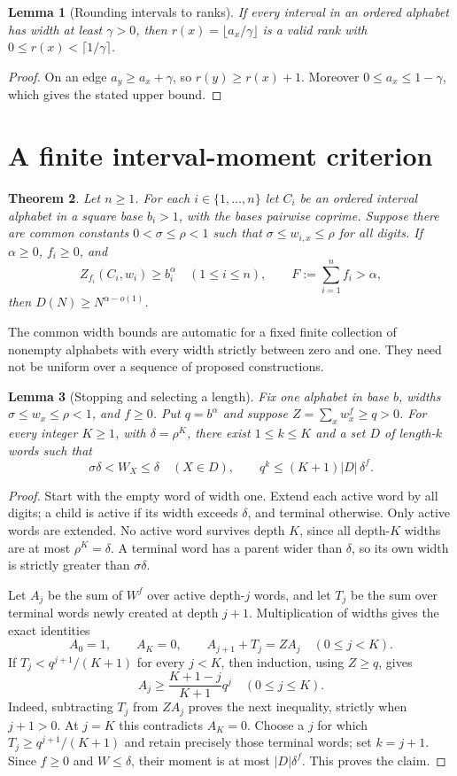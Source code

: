 \documentclass[11pt]{article}
\newtheorem{theorem}{Theorem}[section]
\newtheorem{lemma}[theorem]{Lemma}
\theoremstyle{definition}
\theoremstyle{remark}
\newcommand{\card}[1]{\lvert #1\rvert}
\begin{document}
\begin{lemma}[Rounding intervals to ranks]\label{lem:round}
If every interval in an ordered alphabet has width at least $\gamma>0$,
then $r(x)=\lfloor a_x/\gamma\rfloor$ is a valid rank with
$0\le r(x)<\lceil1/\gamma\rceil$.
\end{lemma}
\begin{proof}
On an edge $a_y\ge a_x+\gamma$, so $r(y)\ge r(x)+1$.
Moreover $0\le a_x\le1-\gamma$, which gives the stated upper bound.
\end{proof}

\section{A finite interval-moment criterion}\label{sec:criterion}
\begin{theorem}\label{thm:criterion}
Let $n\ge1$. For each $i\in\{1,\ldots,n\}$ let $C_i$ be an ordered
interval alphabet in a square base $b_i>1$, with the bases pairwise coprime.
Suppose there are common constants $0<\sigma\le\rho<1$ such that
$\sigma\le w_{i,x}\le\rho$ for all digits. If $\alpha\ge0$, $f_i\ge0$,
and
\[
 Z_{f_i}(C_i,w_i)\ge b_i^\alpha\quad(1\le i\le n),
 \qquad F:=\sum_{i=1}^nf_i>\alpha,
\]
then $D(N)\ge N^{\alpha-o(1)}$.
\end{theorem}
The common width bounds are automatic for a fixed finite collection of
nonempty alphabets with every width strictly between zero and one. They need
not be uniform over a sequence of proposed constructions.

\begin{lemma}[Stopping and selecting a length]\label{lem:stopping}
Fix one alphabet in base $b$, widths $\sigma\le w_x\le\rho<1$, and
$f\ge0$. Put $q=b^\alpha$ and suppose $Z=\sum_xw_x^f\ge q>0$.
For every integer $K\ge1$, with $\delta=\rho^K$, there exist
$1\le k\le K$ and a set $D$ of length-$k$ words such that
\[
 \sigma\delta<W_X\le\delta\quad(X\in D),\qquad
 q^k\le(K+1)\card D\,\delta^f.
\]
\end{lemma}
\begin{proof}
Start with the empty word of width one. Extend each active word by all
digits; a child is active if its width exceeds $\delta$, and terminal
otherwise. Only active words are extended. No active word survives depth
$K$, since all depth-$K$ widths are at most $\rho^K=\delta$.
A terminal word has a parent wider than $\delta$, so its own width is
strictly greater than $\sigma\delta$.

Let $A_j$ be the sum of $W^f$ over active depth-$j$ words, and let $T_j$
be the sum over terminal words newly created at depth $j+1$. Multiplication
of widths gives the exact identities
\[
 A_0=1,\qquad A_K=0,\qquad A_{j+1}+T_j=Z A_j\quad(0\le j<K).
\]
If $T_j<q^{j+1}/(K+1)$ for every $j<K$, then induction, using $Z\ge q$,
gives
\[
 A_j\ge \frac{K+1-j}{K+1}q^j\quad(0\le j\le K).
\]
Indeed, subtracting $T_j$ from $ZA_j$ proves the next inequality, strictly
when $j+1>0$. At $j=K$ this contradicts $A_K=0$. Choose a $j$ for which
$T_j\ge q^{j+1}/(K+1)$ and retain precisely those terminal words; set
$k=j+1$. Since $f\ge0$ and $W\le\delta$, their moment is at most
$\card D\delta^f$. This proves the claim.
\end{proof}
\end{document}
